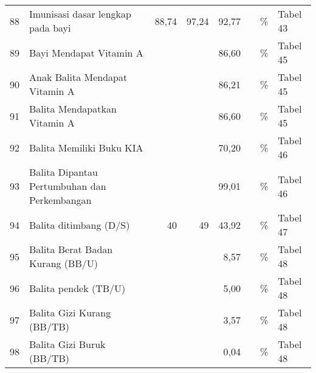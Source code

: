 \begin{small}
\begin{longtable}{rY{12em}rrrrY{5em}Y{5em}}
	                   88 & Imunisasi dasar lengkap pada bayi                                                     &  88,74 &  97,24 &   92,77 &                   & \%                             & Tabel 43 \\
	 89 & Bayi Mendapat Vitamin A                                                               &        &        &   86,60 &                   & \%                             & Tabel 45 \\
	                   90 & Anak Balita Mendapat Vitamin A                                                        &        &        &   86,21 &                   & \%                             & Tabel 45 \\
	 91 & Balita Mendapatkan Vitamin A                                                          &        &        &   86,60 &                   & \%                             & Tabel 45 \\
	                   92 & Balita Memiliki Buku KIA                                                              &        &        &   70,20 &                   & \%                             & Tabel 46 \\
	 93 & Balita Dipantau Pertumbuhan dan Perkembangan                                          &        &        &   99,01 &                   & \%                             & Tabel 46 \\
	                   94 & Balita ditimbang (D/S)                                                                &     40 &     49 &   43,92 &                   & \%                             & Tabel 47 \\
	 95 & Balita Berat Badan Kurang (BB/U)                                                      &        &        &    8,57 &                   & \%                             & Tabel 48 \\
	                   96 & Balita pendek (TB/U)                                                                  &        &        &    5,00 &                   & \%                             & Tabel 48 \\
	 97 & Balita Gizi Kurang (BB/TB)                                                            &        &        &    3,57 &                   & \%                             & Tabel 48 \\
	                   98 & Balita Gizi Buruk (BB/TB)                                                             &        &        &    0,04 &                   & \%                             & Tabel 48 \\

\end{longtable}
\end{small}
